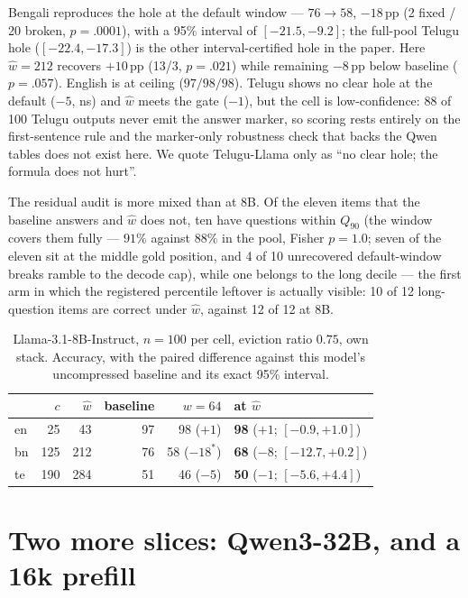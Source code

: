 \documentclass{article}
\begin{document}
Bengali reproduces the hole at the default window --- $76 \to 58$,
$-18$\,pp (2 fixed / 20 broken, $p{=}.0001$), with a 95\% interval of
$[-21.5, -9.2]$; the full-pool Telugu hole ($[-22.4,-17.3]$) is the other
interval-certified hole in the paper. Here $\hat w{=}212$ recovers
$+10$\,pp (13/3, $p{=}.021$) while remaining $-8$\,pp below baseline
($p{=}.057$). English is at ceiling ($97/98/98$). Telugu shows no
clear hole at the default ($-5$, ns) and $\hat w$ meets the gate
($-1$), but the cell is low-confidence: 88 of 100 Telugu outputs never
emit the answer marker, so scoring rests entirely on the
first-sentence rule and the marker-only robustness check that backs
the Qwen tables does not exist here. We quote Telugu-Llama only as
``no clear hole; the formula does not hurt''.

The residual audit is more mixed than at 8B. Of the eleven items that
the baseline answers and $\hat w$ does not, ten have questions within
$Q_{90}$ (the window covers them fully --- $91\%$ against $88\%$ in
the pool, Fisher $p{=}1.0$; seven of the eleven sit at the
middle gold position, and 4 of 10 unrecovered default-window breaks
ramble to the decode cap), while one belongs to the long
decile --- the first arm in which the registered percentile leftover
is actually visible: 10 of 12 long-question items are correct under
$\hat w$, against 12 of 12 at 8B.

\begin{table}[h]
\caption{Llama-3.1-8B-Instruct, $n{=}100$ per cell, eviction ratio
$0.75$, own stack. Accuracy, with the paired difference against this
model's uncompressed baseline and its exact 95\% interval.}
\label{tab:llama}
\centering
\small
\begin{tabular}{lrrrrl}
\toprule
 & $c$ & $\hat w$ & baseline & $w{=}64$ & at $\hat w$ \\
\midrule
en & 25 & 43 & 97 & 98 (${+}1$) & \textbf{98} (${+}1$; $[-0.9, +1.0]$) \\
bn & 125 & 212 & 76 & 58 (${-}18^{*}$) & \textbf{68} (${-}8$; $[-12.7, +0.2]$) \\
te & 190 & 284 & 51 & 46 (${-}5$) & \textbf{50} (${-}1$; $[-5.6, +4.4]$) \\
\bottomrule
\end{tabular}
\end{table}

\section{Two more slices: Qwen3-32B, and a 16k prefill}
\label{app:scale16k}
\end{document}
